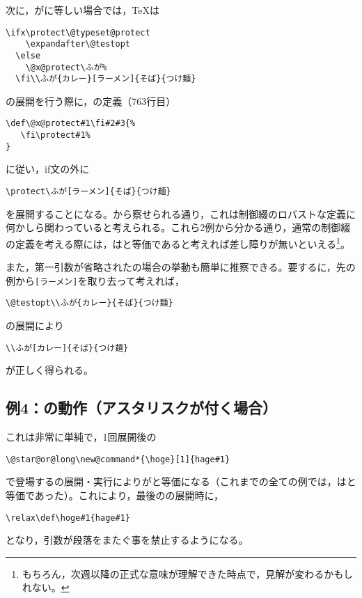 \documentclass[autodetect-engine,dvipdfmx]{jsarticle}
\begin{document}
次に，がに等しい場合では，\TeX は
\begin{lstlisting}
\ifx\protect\@typeset@protect
    \expandafter\@testopt
  \else
    \@x@protect\ふが%
  \fi\\ふが{カレー}[ラーメン]{そば}{つけ麺}
\end{lstlisting}
の展開を行う際に，の定義（763行目）
\begin{lstlisting}
\def\@x@protect#1\fi#2#3{%
   \fi\protect#1%
}
\end{lstlisting}
に従い，if文の外に
\begin{lstlisting}
\protect\ふが[ラーメン]{そば}{つけ麺}
\end{lstlisting}
を展開することになる。から察せられる通り，これは制御綴のロバストな定義に何かしら関わっていると考えられる。これら2例から分かる通り，通常の制御綴の定義を考える際には，はと等価であると考えれば差し障りが無いといえる\footnote{もちろん，次週以降の正式な意味が理解できた時点で，見解が変わるかもしれない。}。

また，第一引数が省略されたの場合の挙動も簡単に推察できる。要するに，先の例から\texttt{[ラーメン]}を取り去って考えれば，
\begin{lstlisting}
\@testopt\\ふが{カレー}{そば}{つけ麺}
\end{lstlisting}
の展開により
\begin{lstlisting}
\\ふが[カレー]{そば}{つけ麺}
\end{lstlisting}
が正しく得られる。

\subsection{例4：の動作（アスタリスクが付く場合）}

これは非常に単純で，1回展開後の
\begin{lstlisting}
\@star@or@long\new@command*{\hoge}[1]{hage#1}
\end{lstlisting}
で登場するの展開・実行によりがと等価になる（これまでの全ての例では，はと等価であった）。これにより，最後のの展開時に，
\begin{lstlisting}
\relax\def\hoge#1{hage#1}
\end{lstlisting}
となり，引数が段落をまたぐ事を禁止するようになる。
\end{document}
